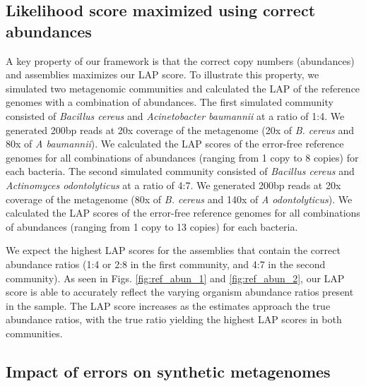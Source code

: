 \subsection{Likelihood score maximized using correct abundances}
A key property of our framework is that the correct copy numbers (abundances) and assemblies maximizes our LAP score.
To illustrate this property, we simulated two metagenomic communities and calculated the LAP of the reference genomes with a combination of abundances.
The first simulated community consisted of \emph{Bacillus cereus} and \emph{Acinetobacter baumannii} at a ratio of 1:4.
We generated 200bp reads at 20x coverage of the metagenome (20x of \emph{B. cereus} and 80x of \emph{A baumannii}).
We calculated the LAP scores of the error-free reference genomes for all combinations of abundances (ranging from 1 copy to 8 copies) for each bacteria.
The second simulated community consisted of \emph{Bacillus cereus} and \emph{Actinomyces odontolyticus} at a ratio of 4:7.
We generated 200bp reads at 20x coverage of the metagenome (80x of \emph{B. cereus} and 140x of \emph{A odontolyticus}).
We calculated the LAP scores of the error-free reference genomes for all combinations of abundances (ranging from 1 copy to 13 copies) for each bacteria.



We expect the highest LAP scores for the assemblies that contain the correct abundance ratios (1:4 or 2:8 in the first community, and 4:7 in the second community).
As seen in Figs. \ref{fig:ref_abun_1} and \ref{fig:ref_abun_2}, our LAP score is able to accurately reflect the varying organism abundance ratios present in the sample.
The LAP score increases as the estimates approach the true abundance ratios, with the true ratio yielding the highest LAP scores in both communities.


\subsection{Impact of errors on synthetic metagenomes}

